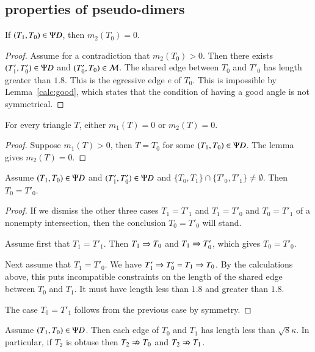 \subsection{properties of pseudo-dimers}

\begin{lemma}\label{lemma:pd-m2}  If $(T_1,T_0)\in\Psi D$, then $m_2(T_0)=0$.
\end{lemma}

\begin{proof} Assume for a contradiction that $m_2(T_0)>0$.  Then there exists $(T'_1,T_0')\in\Psi D$ and
$(T'_0,T_0)\in\mathcal M$.  The shared edge between $T_0$ and $T'_0$ has length greater than $1.8$.
This is the egressive edge $e$ of $T_0$.  This is impossible by Lemma~\ref{calc:good}, which states
that the condition of having a good angle is not symmetrical.
\end{proof}

\begin{corollary}  For every triangle $T$, either $m_1(T)=0$ or $m_2(T)=0$.
\end{corollary}

\begin{proof}  Suppose $m_1(T)>0$, then $T=T_0$ for some $(T_1,T_0)\in\Psi D$.  The
lemma gives $m_2(T)=0$.
\end{proof}

\begin{lemma}  Assume $(T_1,T_0)\in \Psi D$ and $(T'_1,T'_0)\in\Psi D$ and
$\{T_0,T_1\}\cap\{T'_0,T'_1\} \ne \emptyset$.  Then $T_0 = T'_0$.
\end{lemma}

\begin{proof}  If we dismiss the other three cases $T_1=T'_1$ and $T_1=T'_0$ and $T_0=T'_1$ of a nonempty
intersection, then the conclusion $T_0 = T'_0$ will stand.

Assume first that $T_1 = T'_1$.  Then $T_1\Rightarrow T_0$ and $T_1\Rightarrow T'_0$, which gives $T_0=T'_0$.

Next assume that $T_1=T'_0$.  We have $T'_1\Rightarrow T'_0 = T_1 \Rightarrow T_0$.  By the calculations above,
this puts incompatible constraints on the length of the shared edge between $T_0$ and $T_1$.  It must have
length less than $1.8$ and greater than $1.8$.

The case $T_0=T'_1$ follows from the previous case by symmetry.
\end{proof}

\begin{lemma}\label{lemma:pd-obtuse}
Assume $(T_1,T_0)\in\Psi D$.  Then each edge of $T_0$ and $T_1$ has length less than $\sqrt8\kappa$.
In particular, if  $T_2$ is obtuse then  $T_2\nRightarrow T_0$ and $T_2 \nRightarrow T_1$.
\end{lemma}

